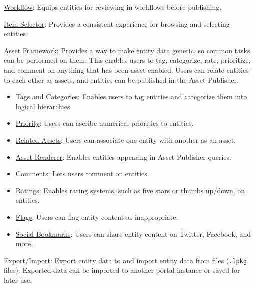\href{/docs/7-2/frameworks/-/knowledge_base/f/the-workflow-framework}{Workflow}:
Equips entities for reviewing in workflows before publishing.

\href{/docs/7-2/frameworks/-/knowledge_base/f/item-selector}{Item
Selector}: Provides a consistent experience for browsing and selecting
entities.

\href{/docs/7-2/frameworks/-/knowledge_base/f/asset-framework}{Asset
Framework}: Provides a way to make entity data generic, so common tasks
can be performed on them. This enables users to tag, categorize, rate,
prioritize, and comment on anything that has been asset-enabled. Users
can relate entities to each other as assets, and entities can be
published in the Asset Publisher.

\begin{itemize}
\tightlist
\item
  \href{/docs/7-2/frameworks/-/knowledge_base/f/implementing-asset-categorization-and-tagging}{Tags
  and Categories}: Enables users to tag entities and categorize them
  into logical hierarchies.
\item
  \href{/docs/7-2/frameworks/-/knowledge_base/f/implementing-asset-priority}{Priority}:
  Users can ascribe numerical priorities to entities.
\item
  \href{/docs/7-2/frameworks/-/knowledge_base/f/relating-assets}{Related
  Assets}: Users can associate one entity with another as an asset.
\item
  \href{/docs/7-2/frameworks/-/knowledge_base/f/asset-framework}{Asset
  Renderer}: Enables entities appearing in Asset Publisher queries.
\item
  \href{/docs/7-2/frameworks/-/knowledge_base/f/adding-comments-to-your-app}{Comments}:
  Lets users comment on entities.
\item
  \href{/docs/7-2/frameworks/-/knowledge_base/f/rating-assets}{Ratings}:
  Enables rating systems, such as five stars or thumbs up/down, on
  entities.
\item
  \href{/docs/7-2/frameworks/-/knowledge_base/f/flagging-inappropriate-asset-content}{Flags}:
  Users can flag entity content as inappropriate.
\item
  \href{/docs/7-2/frameworks/-/knowledge_base/f/applying-social-bookmarks}{Social
  Bookmarks}: Users can share entity content on Twitter, Facebook, and
  more.
\end{itemize}

\href{/docs/7-2/frameworks/-/knowledge_base/f/export-import}{Export/Import}:
Export entity data to and import entity data from files (\texttt{.lpkg}
files). Exported data can be imported to another portal instance or
saved for later use.

